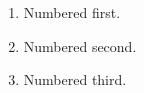 \begin{enumerate}
\item Numbered first.
\item Numbered second.
\item Numbered third.
\end{enumerate}

